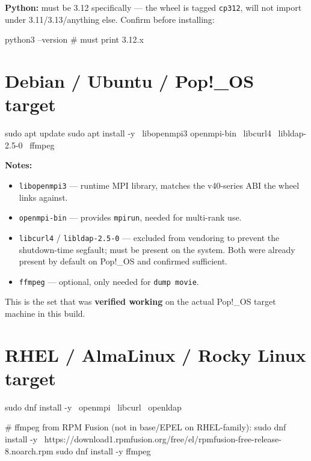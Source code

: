 \documentclass[11pt]{article}
\begin{document}
\textbf{Python:} must be 3.12 specifically --- the wheel is tagged
\texttt{cp312}, will not import under 3.11/3.13/anything else.  Confirm before
installing:

\begin{codebox}
python3 --version   # must print 3.12.x
\end{codebox}

\section{Debian / Ubuntu / Pop!\_OS target}

\begin{codebox}
sudo apt update
sudo apt install -y \
    libopenmpi3 openmpi-bin \
    libcurl4 \
    libldap-2.5-0 \
    ffmpeg
\end{codebox}

\textbf{Notes:}
\begin{itemize}
  \item \texttt{libopenmpi3} --- runtime MPI library, matches the v40-series
    ABI the wheel links against.
  \item \texttt{openmpi-bin} --- provides \texttt{mpirun}, needed for
    multi-rank use.
  \item \texttt{libcurl4} / \texttt{libldap-2.5-0} --- excluded from vendoring
    to prevent the shutdown-time segfault; must be present on the system.
    Both were already present by default on Pop!\_OS and confirmed sufficient.
  \item \texttt{ffmpeg} --- optional, only needed for \texttt{dump movie}.
\end{itemize}

This is the set that was \textbf{verified working} on the actual Pop!\_OS
target machine in this build.

\section{RHEL / AlmaLinux / Rocky Linux target}

\begin{codebox}
sudo dnf install -y \
    openmpi \
    libcurl \
    openldap

# ffmpeg from RPM Fusion (not in base/EPEL on RHEL-family):
sudo dnf install -y \
    https://download1.rpmfusion.org/free/el/rpmfusion-free-release-8.noarch.rpm
sudo dnf install -y ffmpeg
\end{codebox}
\end{document}
